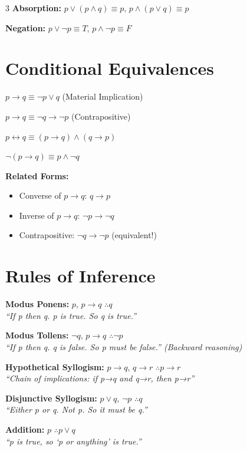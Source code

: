 \documentclass[10pt,landscape,a4paper]{article}
\newcommand{\tand}{\wedge}
\newcommand{\tor}{\vee}
\newcommand{\tnot}{\neg}
\newcommand{\timplies}{\rightarrow}
\newcommand{\tiff}{\leftrightarrow}
\begin{document}
\begin{multicols}{3}
\textbf{Absorption:} $p \tor (p \tand q) \equiv p$, \quad $p \tand (p \tor q) \equiv p$

\textbf{Negation:} $p \tor \tnot p \equiv T$, \quad $p \tand \tnot p \equiv F$

\section*{Conditional Equivalences}

$p \timplies q \equiv \tnot p \tor q$ \hfill (Material Implication)

$p \timplies q \equiv \tnot q \timplies \tnot p$ \hfill (Contrapositive)

$p \tiff q \equiv (p \timplies q) \tand (q \timplies p)$

$\tnot(p \timplies q) \equiv p \tand \tnot q$

\textbf{Related Forms:}
\begin{itemize}[nosep,leftmargin=*]
\item Converse of $p \timplies q$: $q \timplies p$
\item Inverse of $p \timplies q$: $\tnot p \timplies \tnot q$
\item Contrapositive: $\tnot q \timplies \tnot p$ (equivalent!)
\end{itemize}

\section*{Rules of Inference}

\textbf{Modus Ponens:} $p$, $p \timplies q$ $\therefore q$\\
{\small \textit{``If p then q. p is true. So q is true.''}}

\textbf{Modus Tollens:} $\tnot q$, $p \timplies q$ $\therefore \tnot p$\\
{\small \textit{``If p then q. q is false. So p must be false.'' (Backward reasoning)}}

\textbf{Hypothetical Syllogism:} $p \timplies q$, $q \timplies r$ $\therefore p \timplies r$\\
{\small \textit{``Chain of implications: if p→q and q→r, then p→r''}}

\textbf{Disjunctive Syllogism:} $p \tor q$, $\tnot p$ $\therefore q$\\
{\small \textit{``Either p or q. Not p. So it must be q.''}}

\textbf{Addition:} $p$ $\therefore p \tor q$\\
{\small \textit{``p is true, so `p or anything' is true.''}}


\end{multicols}
\end{document}
